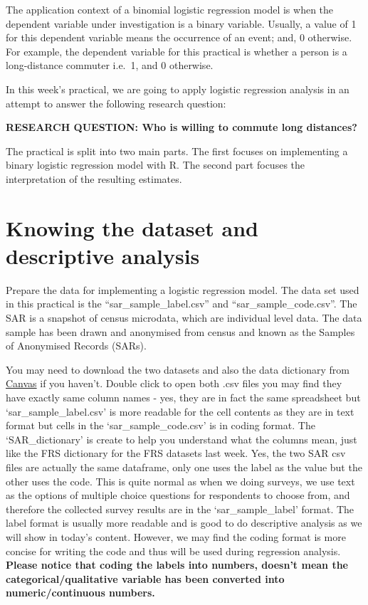 \documentclass[
  letterpaper,
  DIV=11,
  numbers=noendperiod]{scrreprt}
\begin{document}
The application context of a binomial logistic regression model is when
the dependent variable under investigation is a binary variable.
Usually, a value of 1 for this dependent variable means the occurrence
of an event; and, 0 otherwise. For example, the dependent variable for
this practical is whether a person is a long-distance commuter i.e.~1,
and 0 otherwise.

In this week's practical, we are going to apply logistic regression
analysis in an attempt to answer the following research question:

\textbf{RESEARCH QUESTION: Who is willing to commute long distances?}

The practical is split into two main parts. The first focuses on
implementing a binary logistic regression model with R. The second part
focuses the interpretation of the resulting estimates.

\section{Knowing the dataset and descriptive
analysis}\label{knowing-the-dataset-and-descriptive-analysis}

Prepare the data for implementing a logistic regression model. The data
set used in this practical is the ``sar\_sample\_label.csv'' and
``sar\_sample\_code.csv''. The SAR is a snapshot of census microdata,
which are individual level data. The data sample has been drawn and
anonymised from census and known as the Samples of Anonymised Records
(SARs).

You may need to download the two datasets and also the data dictionary
from
\href{https://canvas.liverpool.ac.uk/courses/84668/pages/sample-of-anonymised-records-sar-dataset?module_item_id=2422237}{Canvas}
if you haven't. Double click to open both .csv files you may find they
have exactly same column names - yes, they are in fact the same
spreadsheet but `sar\_sample\_label.csv' is more readable for the cell
contents as they are in text format but cells in the
`sar\_sample\_code.csv' is in coding format. The `SAR\_dictionary' is
create to help you understand what the columns mean, just like the FRS
dictionary for the FRS datasets last week. Yes, the two SAR csv files
are actually the same dataframe, only one uses the label as the value
but the other uses the code. This is quite normal as when we doing
surveys, we use text as the options of multiple choice questions for
respondents to choose from, and therefore the collected survey results
are in the `sar\_sample\_label' format. The label format is usually more
readable and is good to do descriptive analysis as we will show in
today's content. However, we may find the coding format is more concise
for writing the code and thus will be used during regression analysis.
\textbf{Please notice that coding the labels into numbers, doesn't mean
the categorical/qualitative variable has been converted into
numeric/continuous numbers.}
\end{document}
